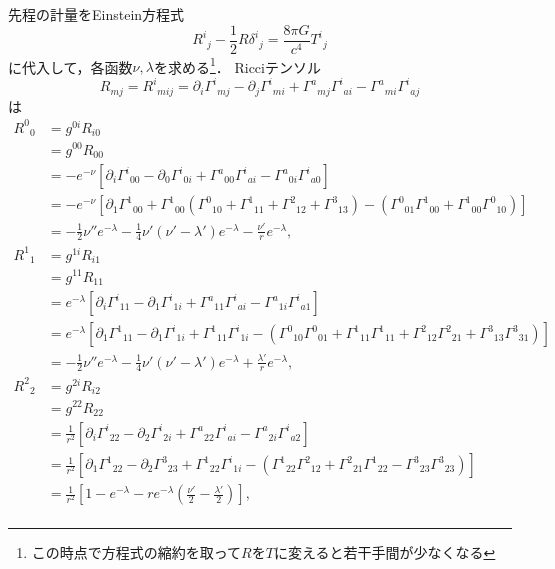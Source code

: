 \documentclass[a4paper]{ltjsreport}
\begin{document}
先程の計量をEinstein方程式
\[ {R^i}_j - \frac{1}{2} R {\delta^i}_j = \frac{8\pi{}G}{c^4}{T^i}_j \]
に代入して，各函数$\nu, \lambda$を求める\footnote{この時点で方程式の縮約を取って$R$を$T$に変えると若干手間が少なくなる}．
Ricciテンソル
\[R_{mj}={R^i}_{mij}=\partial_i{\Gamma^i}_{mj} - \partial_j{\Gamma^i}_{mi} + {\Gamma^a}_{mj}{\Gamma^i}_{ai} - {\Gamma^a}_{mi}{\Gamma^i}_{aj}\]
は
\begin{align*}
  {R^0}_0 &= g^{0i}R_{i0}\\
  &= g^{00}R_{00}\\
  &= -  e^{ - \nu}\left[\partial_i{\Gamma^i}_{00} - \partial_0{\Gamma^i}_{0i} + {\Gamma^a}_{00}{\Gamma^i}_{ai} - {\Gamma^a}_{0i}{\Gamma^i}_{a0}\right]\\
  &= -  e^{ - \nu}\left[\partial_1{\Gamma^1}_{00} + {\Gamma^1}_{00}\left({\Gamma^0}_{10} + {\Gamma^1}_{11} + {\Gamma^2}_{12} + {\Gamma^3}_{13}\right) - \left({\Gamma^0}_{01}{\Gamma^1}_{00} + {\Gamma^1}_{00}{\Gamma^0}_{10}\right)\right]\\
  &= -  \frac{1}{2}\nu''e^{ - \lambda} - \frac{1}{4}\nu'(\nu' - \lambda')e^{ - \lambda} - \frac{\nu'}{r}e^{ - \lambda}, \\
  {R^1}_1 &= g^{1i}R_{i1}\\
  &= g^{11}R_{11}\\
  &= e^{ - \lambda}\left[\partial_i{\Gamma^i}_{11} - \partial_1{\Gamma^i}_{1i} + {\Gamma^a}_{11}{\Gamma^i}_{ai} - {\Gamma^a}_{1i}{\Gamma^i}_{a1}\right]\\
  &= e^{ - \lambda}\left[\partial_1{\Gamma^1}_{11} - \partial_1{\Gamma^i}_{1i} + {\Gamma^1}_{11}{\Gamma^i}_{1i} - \left({\Gamma^0}_{10}{\Gamma^0}_{01} + {\Gamma^1}_{11}{\Gamma^1}_{11} + {\Gamma^2}_{12}{\Gamma^2}_{21} + {\Gamma^3}_{13}{\Gamma^3}_{31}\right)\right]\\
  &= -  \frac{1}{2}\nu''e^{ - \lambda} - \frac{1}{4}\nu'(\nu' - \lambda')e^{ - \lambda} + \frac{\lambda'}{r}e^{ - \lambda} , \\
  {R^2}_2 &= g^{2i}R_{i2}\\
  &= g^{22}R_{22}\\
  &= \frac{1}{r^2}\left[\partial_i{\Gamma^i}_{22} - \partial_2{\Gamma^i}_{2i} + {\Gamma^a}_{22}{\Gamma^i}_{ai} - {\Gamma^a}_{2i}{\Gamma^i}_{a2}\right]\\
  &= \frac{1}{r^2}\left[\partial_1{\Gamma^1}_{22} - \partial_2{\Gamma^3}_{23} + {\Gamma^1}_{22}{\Gamma^i}_{1i} - \left({\Gamma^1}_{22}{\Gamma^2}_{12} + {\Gamma^2}_{21}{\Gamma^1}_{22} - {\Gamma^3}_{23}{\Gamma^3}_{23}\right)\right]\\
  &= \frac{1}{r^2}\left[1 - e^{ - \lambda} - re^{ - \lambda}\left(\frac{\nu'}{2} - \frac{\lambda'}{2}\right)\right] , \\

\end{align*}
\end{document}
